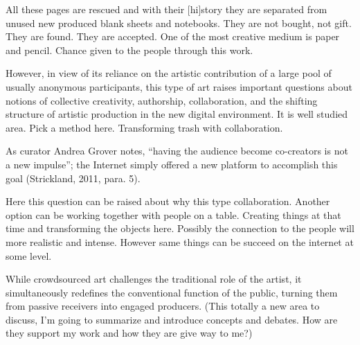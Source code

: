 All these pages are rescued and with their [hi]story they are separated from unused new produced blank sheets and notebooks. They are not bought, not gift. They are found. They are accepted. One of the most creative medium is paper and pencil. Chance given to the people through this work.

However, in view of its reliance on the artistic contribution of a large pool of usually anonymous participants, this type of art raises important questions about notions of collective creativity, authorship, collaboration, and the shifting structure of artistic production in the new digital environment. It is well studied area. Pick a method here. Transforming trash with collaboration.

As curator Andrea Grover notes, “having the audience become co-creators is not a new impulse”; the Internet simply offered a new platform to accomplish this goal (Strickland, 2011, para. 5).

Here this question can be raised about why this type collaboration. Another option can be working together with people on a table. Creating things at that time and transforming the objects here. Possibly the connection to the people will more realistic and intense. However same things can be succeed on the internet at some level. 

While crowdsourced art challenges the traditional role of the artist, it simultaneously redefines the conventional function of the public, turning them from passive receivers into engaged producers. (This totally a new area to discuss, I'm going to summarize and introduce concepts and debates. How are they support my work and how they are give way to me?)









